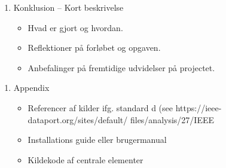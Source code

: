 \documentclass{report}
\begin{document}
    \begin{enumerate}
        \item Konklusion – Kort beskrivelse
        \begin{itemize}
            \item Hvad er gjort og hvordan.
            \item Reflektioner på forløbet og opgaven.
            \item Anbefalinger på fremtidige udvidelser på projectet.
        \end{itemize}
    \end{enumerate}
    \begin{enumerate}
        \item Appendix
        \begin{itemize}
            \item Referencer af kilder ifg. standard d (see https://ieee-dataport.org/sites/default/ files/analysis/27/IEEE%
            \item Installations guide eller brugermanual
            \item Kildekode af centrale elementer
        \end{itemize}
    \end{enumerate}

    
    
    
\end{document}
